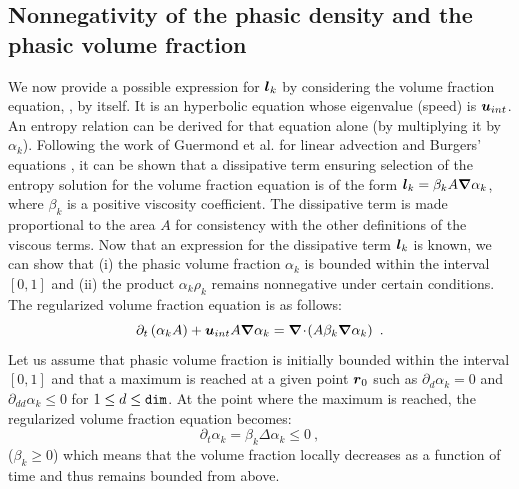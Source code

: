 \subsection{Nonnegativity of the phasic density and the phasic volume fraction}\label{sct:positivity}
%
We now provide a possible expression for $\boldsymbol l_k$ by considering the volume fraction equation, , by itself. 
It is an hyperbolic equation
whose eigenvalue (speed) is $\boldsymbol u_{int}$. An entropy relation can be derived for that equation alone (by multiplying it by $\alpha_k$).
Following the work of Guermond et al. for linear advection and Burgers' equations \cite{jlg_EVM_JCP2011,jlg_EVM_CSE2011}, it can be shown that a dissipative term ensuring 
selection of the entropy solution for the volume fraction equation is of the form $\boldsymbol l_k = \beta_k A \boldsymbol\nabla \alpha_k $, where $\beta_k$
is a positive viscosity coefficient. The dissipative term is made proportional to the area $A$ for consistency with 
the other definitions of the viscous terms. Now that an expression for the dissipative term $\boldsymbol l_k$ is known, we can show that (i) the phasic
volume fraction $\alpha_k$ is bounded within the interval $[0,1]$ and (ii) the product $\alpha_k \rho_k$ remains nonnegative under certain conditions.
The regularized volume fraction equation is as follows:
%
\begin{equation}\label{eq:final-reg-vf-equ}
\partial_t \left( \alpha_k A \right) + \boldsymbol u_{int} A \boldsymbol\nabla \alpha_k= \boldsymbol\nabla\! \cdot \! \left( A \beta_k \boldsymbol\nabla \alpha_k \right) \ .
\end{equation}
%
Let us assume that phasic volume fraction is initially bounded within the interval $[0, 1]$ and that a maximum is reached at a given point $\boldsymbol r_0$
such as $ \partial_d \alpha_k = 0$ and $\partial_{dd} \alpha_k \leq 0$ for $1\le d \le {\tt dim}$. 
At the point where the maximum is reached, the regularized volume fraction equation becomes:
%
\begin{equation}\label{eq:final-reg-vf-equ-max}
\partial_t \alpha_k = \beta_k \Delta \alpha_k \leq 0 \ ,
\end{equation}
%
($\beta_k \ge 0$) which means that the volume fraction locally decreases as a function of time and thus remains bounded from above. 
